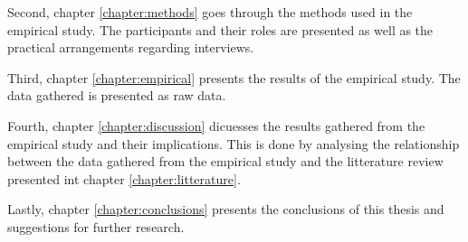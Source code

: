 Second, chapter \ref{chapter:methods} goes through the methods used in the empirical study. The participants and their roles are presented as well as the practical arrangements regarding interviews.

Third, chapter \ref{chapter:empirical} presents the results of the empirical study. The data gathered is presented as raw data.

Fourth, chapter \ref{chapter:discussion} dicuesses the results gathered from the empirical study and their implications. This is done by analysing the relationship between the data gathered from the empirical study and the litterature review presented int chapter \ref{chapter:litterature}.

Lastly, chapter \ref{chapter:conclusions} presents the conclusions of this thesis and suggestions for further research.
